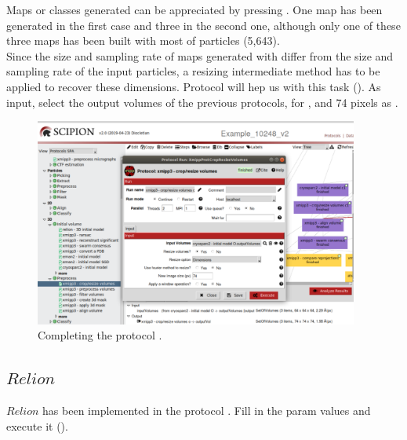 Maps or  classes generated can be appreciated by pressing . One map has been generated in the first case and three in the second one, although only one of these three maps has been built with most of particles (5,643).\\

Since the size and sampling rate of maps generated with  differ from the size and sampling rate of the input particles, a resizing intermediate method has to be applied to recover these dimensions. Protocol  will hep us with this task (). As input, select the output volume\/s of the previous protocols,  for , and 74 pixels as .

\begin{figure}[H]
  \centering
  \captionsetup{width=.8\linewidth} 
  \includegraphics[width=0.95\textwidth]
  {images/crop_resize.pdf}
  \caption{Completing the protocol .}
  \label{fig:crop_resize}
  \end{figure}

\subsection*{$Relion$ }
$Relion$  has been implemented in the protocol . Fill in the param values and execute it (). 

